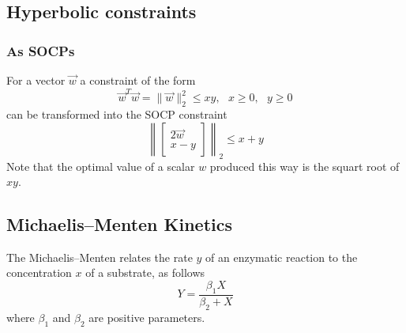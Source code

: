 \documentclass{article}
\begin{document}
\subsection{Hyperbolic constraints}

\subsubsection{As SOCPs}

For a vector $\vec{w}$ a constraint of the form
\begin{equation}
\vec{w}^T\vec{w}=\lVert\vec{w}\rVert^2_2\le xy,~~~x\ge0,~~~y\ge0
\end{equation}
can be transformed into the SOCP constraint
\begin{equation}
\label{equ:hyperbolic-to-socp}
\left\lVert \begin{bmatrix} 2\vec{w} \\ x - y \end{bmatrix} \right\rVert_2 \le x+y
\end{equation}
Note that the optimal value of a scalar $w$ produced this way is the squart root of $xy$.





\subsection{Michaelis--Menten Kinetics}
\label{sec:mmkinetics}


The Michaelis--Menten relates the rate $y$ of an enzymatic reaction to the concentration $x$ of a substrate, as follows
\begin{equation}
\label{equ:mm}
Y = \frac{\beta_1 X}{\beta_2 + X}
\end{equation}
where $\beta_1$ and $\beta_2$ are positive parameters.
\end{document}
